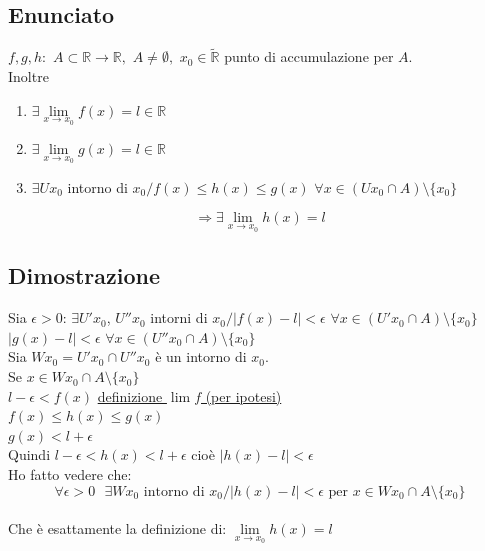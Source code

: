 \documentclass{article}
\newcommand{\R}{\mathbb{R}}
\newcommand{\Rext}{\widetilde{\mathbb{R}}}
\newcommand{\vSpace}{\vspace{1em}}
\begin{document}
\begin{flushleft}
\subsection{Enunciato}
$f, g, h:$ $A \subset \R \rightarrow \R,$ $A \neq \emptyset,$ $x_0 \in \Rext$ punto di accumulazione per $A$.
\\Inoltre
\begin{enumerate}
    \item[] $\exists \lim\limits_{x \to x_0} f(x) = l \in \R$ 
    \item[] $\exists \lim\limits_{x \to x_0} g(x) = l \in \R$
    \item[] $\exists U x_0$ intorno di $x_0 / f(x) \leq h(x) \leq g(x)$ $\forall x \in (U x_0 \cap A) \setminus \{x_0\}$
\end{enumerate}
\[ \Rightarrow \exists \lim\limits_{x \to x_0} h(x) = l \]


\subsection{Dimostrazione}
Sia $\epsilon > 0$: $\exists U' x_0$, $U'' x_0$ intorni di $x_0 / \left|f(x) - l\right| < \epsilon$  $\forall x \in (U' x_0 \cap A) \setminus \{x_0\}$
\\\hspace*{16.32em} $\left|g(x) - l\right| < \epsilon$  $\forall x \in (U'' x_0 \cap A) \setminus \{x_0\}$
\\\vSpace Sia $W x_0 = U' x_0 \cap U'' x_0$ è un intorno di $x_0$.
\\Se $x \in W x_0 \cap A \setminus \{x_0\}$
\vSpace
\\\hspace*{18em}$l - \epsilon < f(x)$ \underline{definizione $\lim f$ (per ipotesi)}
\\\hspace*{18em}\hspace*{3.3em}$f(x) \leq h(x) \leq g(x)$
\\\hspace*{18em}\hspace*{9.8em}$g(x) < l + \epsilon$
\vSpace
\\Quindi $l - \epsilon < h(x) < l + \epsilon$ cioè $\left|h(x) - l\right| < \epsilon$
\\Ho fatto vedere che:
\[
    \forall \epsilon > 0 \text{ } \exists W x_0 \text{ intorno di } x_0 / \left|h(x) - l\right| < \epsilon \text{ per } x \in W x_0 \cap A \setminus \{x_0\}
\]
\\Che è esattamente la definizione di: $\lim\limits_{x \to x_0} h(x) = l$


\end{flushleft}
\end{document}
